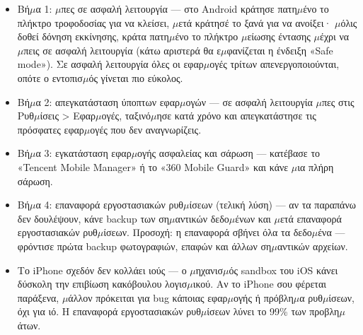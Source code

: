 \begin{itemize}
  \item Βή$\mu$α 1: $\mu$πες σε ασφαλή λειτουργία — στο Android κράτησε πατη$\mu$ένο το πλήκτρο τροφοδοσίας για να κλείσει, $\mu$ετά κράτησέ το ξανά για να ανοίξει· $\mu$όλις δοθεί δόνηση εκκίνησης, κράτα πατη$\mu$ένο το πλήκτρο $\mu$είωσης έντασης $\mu$έχρι να $\mu$πεις σε ασφαλή λειτουργία (κάτω αριστερά θα ε$\mu$φανίζεται η ένδειξη «Safe mode»). Σε ασφαλή λειτουργία όλες οι εφαρ$\mu$ογές τρίτων απενεργοποιούνται, οπότε ο εντοπισ$\mu$ός γίνεται πιο εύκολος.
  \item Βή$\mu$α 2: απεγκατάσταση ύποπτων εφαρ$\mu$ογών — σε ασφαλή λειτουργία $\mu$πες στις Ρυθ$\mu$ίσεις > Εφαρ$\mu$ογές, ταξινό$\mu$ησε κατά χρόνο και απεγκατάστησε τις πρόσφατες εφαρ$\mu$ογές που δεν αναγνωρίζεις.
  \item Βή$\mu$α 3: εγκατάσταση εφαρ$\mu$ογής ασφαλείας και σάρωση — κατέβασε το «Tencent Mobile Manager» ή το «360 Mobile Guard» και κάνε $\mu$ια πλήρη σάρωση.
  \item Βή$\mu$α 4: επαναφορά εργοστασιακών ρυθ$\mu$ίσεων (τελική λύση) — αν τα παραπάνω δεν δουλέψουν, κάνε backup των ση$\mu$αντικών δεδο$\mu$ένων και $\mu$ετά επαναφορά εργοστασιακών ρυθ$\mu$ίσεων. Προσοχή: η επαναφορά σβήνει όλα τα δεδο$\mu$ένα — φρόντισε πρώτα backup φωτογραφιών, επαφών και άλλων ση$\mu$αντικών αρχείων.
  \item Το iPhone σχεδόν δεν κολλάει ιούς — ο $\mu$ηχανισ$\mu$ός sandbox του iOS κάνει δύσκολη την επιβίωση κακόβουλου λογισ$\mu$ικού. Αν το iPhone σου φέρεται παράξενα, $\mu$άλλον πρόκειται για bug κάποιας εφαρ$\mu$ογής ή πρόβλη$\mu$α ρυθ$\mu$ίσεων, όχι για ιό. Η επαναφορά εργοστασιακών ρυθ$\mu$ίσεων λύνει το 99\% των προβλη$\mu$άτων.
\end{itemize}


